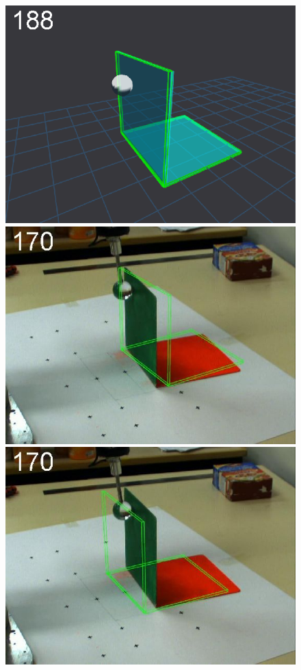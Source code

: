 \begin{figure}[tb]
{\includegraphics[width=\imgBXwid]{images/B1_3exp_20_2}
\includegraphics[width=\imgBXwid]{images/B2_2exp_58_2}
\includegraphics[width=\imgBXwid]{images/B2_1exp_58_2}
}
\end{figure}
